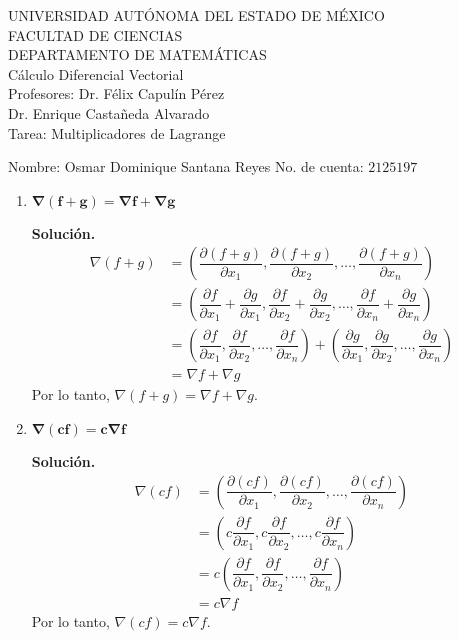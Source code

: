 \documentclass[fleqn, 12pt]{article}
\newcommand{\derivadaparcial}[2]{\dfrac{\partial {#1}}{\partial {#2}}}
\begin{document}
    \begin{center}
        UNIVERSIDAD AUTÓNOMA DEL ESTADO DE MÉXICO \\
        FACULTAD DE CIENCIAS \\
        DEPARTAMENTO DE MATEMÁTICAS \\
        Cálculo Diferencial Vectorial \\
        Profesores: Dr. Félix Capulín Pérez \\
        Dr. Enrique Castañeda Alvarado \\
        Tarea: Multiplicadores de Lagrange
    \end{center}

    Nombre: Osmar Dominique Santana Reyes \hfill No. de cuenta: $ 2125197 $

    \begin{enumerate}
        \item $ \mathbf{\nabla(f + g) = \nabla f + \nabla g} $
        
        \textbf{Solución.}
        \begin{align*}
            \nabla(f + g) &= \left( \derivadaparcial{(f + g)}{x_1}, \derivadaparcial{(f + g)}{x_2}, \ldots , \derivadaparcial{(f + g)}{x_n} \right) \\
            &= \left( \derivadaparcial{f}{x_1} + \derivadaparcial{g}{x_1}, \derivadaparcial{f}{x_2} + \derivadaparcial{g}{x_2}, \ldots , \derivadaparcial{f}{x_n} + \derivadaparcial{g}{x_n} \right) \\
            &= \left( \derivadaparcial{f}{x_1}, \derivadaparcial{f}{x_2}, \ldots , \derivadaparcial{f}{x_n} \right) + \left( \derivadaparcial{g}{x_1}, \derivadaparcial{g}{x_2}, \ldots , \derivadaparcial{g}{x_n} \right) \\
            &= \nabla f + \nabla g
        \end{align*} 
        Por lo tanto, $ \nabla(f + g) = \nabla f + \nabla g $. \\

        \item $ \mathbf{\nabla (cf) = c \nabla f} $

        \textbf{Solución.}
        \begin{align*}
            \nabla(cf) &= \left( \derivadaparcial{(cf)}{x_1}, \derivadaparcial{(cf)}{x_2}, \ldots , \derivadaparcial{(cf)}{x_n} \right) \\
            &= \left( c \derivadaparcial{f}{x_1}, c \derivadaparcial{f}{x_2}, \ldots , c \derivadaparcial{f}{x_n} \right) \\
            &= c \left( \derivadaparcial{f}{x_1}, \derivadaparcial{f}{x_2}, \ldots , \derivadaparcial{f}{x_n} \right) \\
            &= c \nabla f
        \end{align*} 
        Por lo tanto, $ \nabla(cf) =  c \nabla f $. \\


\end{enumerate}
\end{document}
